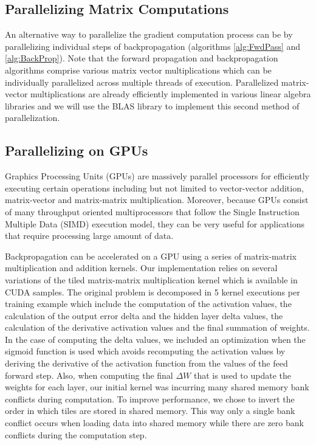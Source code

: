 \subsection{Parallelizing Matrix Computations}
\label{sub:ParMatComp}

An alternative way to parallelize the gradient computation process can be by parallelizing individual steps of backpropagation (algorithms \ref{alg:FwdPass} and \ref{alg:BackProp}).
Note that the forward propagation and backpropagation algorithms comprise various matrix vector multiplications which can be individually parallelized across multiple threads of execution.
Parallelized matrix-vector multiplications are already efficiently implemented in various linear algebra libraries and we will use the BLAS library to implement this second method of parallelization.

\subsection{Parallelizing on GPUs}
\label{sub:GPU}

Graphics Processing Units (GPUs) are massively parallel processors for efficiently executing certain operations including but not limited to vector-vector addition, matrix-vector and matrix-matrix multiplication. Moreover, because GPUs consist of many throughput oriented multiprocessors that follow the Single Instruction Multiple Data (SIMD) execution model, they can be very useful for applications that require processing large amount of data.

Backpropagation can be accelerated on a GPU using a series of matrix-matrix multiplication and addition kernels.
Our implementation relies on several variations of the tiled matrix-matrix multiplication kernel which is available in CUDA samples. 
The original problem is decomposed in 5 kernel executions per training example which include the computation of the activation values, the calculation of the output error delta and the hidden layer delta values, the calculation of the derivative activation values and the final summation of weights. 
In the case of computing the delta values, we included an optimization when the sigmoid function is used which avoids recomputing the activation values by deriving the derivative of the activation function from the values of the feed forward step. 
Also, when computing the final $\Delta W$ that is used to update the weights for each layer, our initial kernel was incurring many shared memory bank conflicts during computation. 
To improve performance, we chose to invert the order in which tiles are stored in shared memory. 
This way only a single bank conflict occurs when loading data into shared memory while there are zero bank conflicts during the computation step.